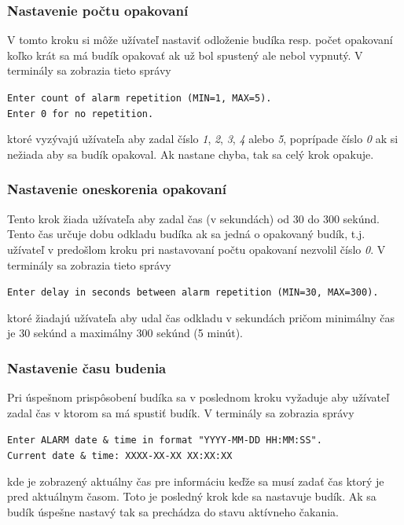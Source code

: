 \documentclass[11pt,a4paper]{article}
\begin{document}
        \subsubsection{Nastavenie počtu opakovaní}

            \indent V tomto kroku si môže užívateľ nastaviť odloženie budíka resp. počet opakovaní koľko krát sa má budík opakovať ak už bol spustený ale nebol vypnutý. V terminály sa zobrazia tieto správy
            \begin{center}
                \texttt{Enter count of alarm repetition (MIN=1, MAX=5).}\\
                \texttt{Enter 0 for no repetition.}
            \end{center}
            ktoré vyzývajú užívateľa aby zadal číslo \textit{1}, \textit{2}, \textit{3}, \textit{4} alebo \textit{5}, poprípade číslo \textit{0} ak si nežiada aby sa budík opakoval. Ak nastane chyba, tak sa celý krok opakuje.

        \subsubsection{Nastavenie oneskorenia opakovaní}

            \indent Tento krok žiada užívateľa aby zadal čas (v sekundách) od 30 do 300 sekúnd. Tento čas určuje dobu odkladu budíka ak sa jedná o opakovaný budík, t.j. užívateľ v predošlom kroku pri nastavovaní počtu opakovaní nezvolil číslo \textit{0}. V terminály sa zobrazia tieto správy
            \begin{center}
                \texttt{Enter delay in seconds between alarm repetition (MIN=30, MAX=300).}
            \end{center}
            ktoré žiadajú užívateľa aby udal čas odkladu v sekundách pričom minimálny čas je 30 sekúnd a maximálny 300 sekúnd (5 minút).

        \subsubsection{Nastavenie času budenia}

            \indent Pri úspešnom prispôsobení budíka sa v poslednom kroku vyžaduje aby užívateľ zadal čas v ktorom sa má spustiť budík. V terminály sa zobrazia správy
            \begin{center}
                \texttt{Enter ALARM date \& time in format "YYYY-MM-DD HH:MM:SS".}\\
                \texttt{Current date \& time: XXXX-XX-XX XX:XX:XX}
            \end{center}
            kde je zobrazený aktuálny čas pre informáciu keďže sa musí zadať čas ktorý je pred aktuálnym časom. Toto je posledný krok kde sa nastavuje budík. Ak sa budík úspešne nastavý tak sa prechádza do stavu aktívneho čakania.
\end{document}
